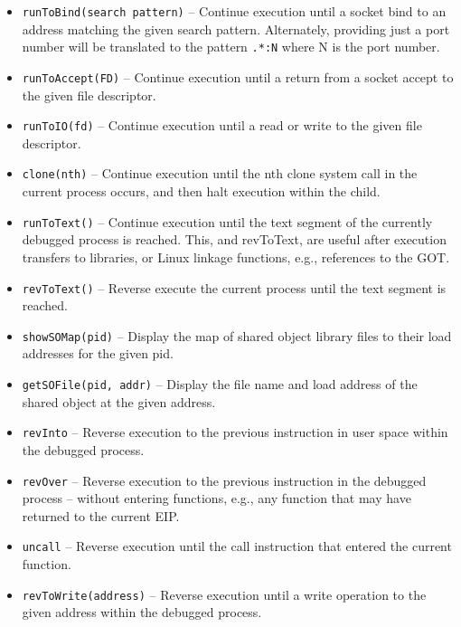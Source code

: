 \documentclass[titlepage]{article}
\begin{document}
\begin{itemize}
\item {\tt runToBind(search pattern)} – Continue execution until a socket bind to an address matching the given search pattern.  Alternately, providing just
a port number will be translated to the pattern {\tt .*:N} where N is the port number.

\item {\tt runToAccept(FD)} – Continue execution until a return from a socket accept to the given file descriptor.

\item {\tt runToIO(fd)} – Continue execution until a read or write to the given file descriptor.

\item {\tt clone(nth)} – Continue execution until the nth clone system call in the current process occurs, and then halt execution within the child.

\item {\tt runToText()} – Continue execution until the text segment of the currently debugged process is reached.  This, and revToText, are useful after execution transfers to libraries, or Linux linkage functions, e.g., references to the GOT.

\item {\tt revToText()} – Reverse execute the current process until the text segment is reached.
 
\item {\tt showSOMap(pid)} – Display the map of shared object library files to their load addresses for the given pid.

\item {\tt getSOFile(pid, addr)} – Display the file name and load address of the shared object at the given address.

\item {\tt revInto} – Reverse execution to the previous instruction in user space within the debugged process. 

\item {\tt revOver} – Reverse execution to the previous instruction in the debugged process – without entering functions, e.g., any function that may have returned to the current EIP.

\item {\tt uncall} – Reverse execution until the call instruction that entered the current function.

\item {\tt revToWrite(address)} – Reverse execution until a write operation to the given address within the debugged process.


\end{itemize}
\end{document}
